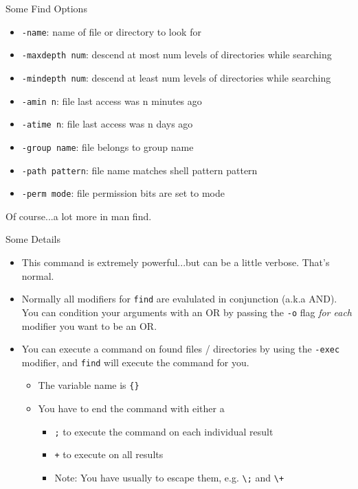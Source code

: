 \documentclass[11pt]{beamer}
\newcommand{\colbf}[1]{\textcolor{mLightBrown!77!black}{#1}}%
\begin{document}
\begin{frame}[fragile]{Some Find Options}
  \begin{itemize}
    \item \texttt{-name}: name of file or directory to look for
    \item \texttt{-maxdepth num}: descend at most num levels of directories while searching
    \item \texttt{-mindepth num}: descend at least num levels of directories while searching
    \item \texttt{-amin n}: file last access was n minutes ago
    \item \texttt{-atime n}: file last access was n days ago
    \item \texttt{-group name}: file belongs to group name
    \item \texttt{-path pattern}: file name matches shell pattern pattern
    \item \texttt{-perm mode}: file permission bits are set to mode
  \end{itemize}

  Of course...a lot more in \colbf{man find}.
\end{frame}

\begin{frame}[fragile]{Some Details}
  \begin{itemize}[<+- | alert@+>]
    \item This command is extremely powerful...but can be a little verbose.  That's normal.
    \item Normally all modifiers for \texttt{find} are evalulated in conjunction (a.k.a AND).  You can condition
          your arguments with an OR by passing the \texttt{-o} flag \emph{for each} modifier you want to be an OR.
    \item You can execute a command on found files / directories by using the \texttt{-exec} modifier, and \texttt{find}
          will execute the command for you.
    \begin{itemize}[<+- | alert@+>]
      \item The variable name is \texttt{\{\}}
      \item You have to end the command with either a
      \begin{itemize}[<+- | alert@+>]
        \item \texttt{;} to execute the command on each individual result
        \item \texttt{+} to execute on all results
        \item \colbf{Note}: You have usually to escape them, e.g. \texttt{\textbackslash ;} and \texttt{\textbackslash +}
      \end{itemize}
    \end{itemize}
  \end{itemize}
\end{frame}
\end{document}
